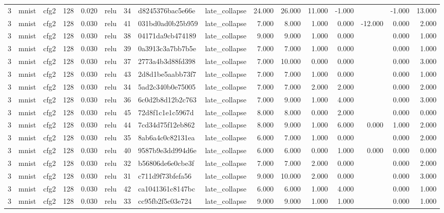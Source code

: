 \begin{table}[htbp]
{\begin{tabular}{@{}rllrrlrllrrrrrrr@{}}
3 & mnist & cfg2 & 128 & 0.020 & relu & 34 & d8245376bac5e66e & late\_collapse & 24.000 & 26.000 & 11.000 & -1.000 &  & -1.000 & 13.000 \\
3 & mnist & cfg2 & 128 & 0.030 & relu & 41 & 031bd0ad0b25b959 & late\_collapse & 7.000 & 8.000 & 1.000 & 0.000 & -12.000 & 0.000 & 2.000 \\
3 & mnist & cfg2 & 128 & 0.030 & relu & 38 & 04171da9cb474189 & late\_collapse & 9.000 & 9.000 & 1.000 & 0.000 &  & 0.000 & 1.000 \\
3 & mnist & cfg2 & 128 & 0.030 & relu & 39 & 0a3913c3a7bb7b5e & late\_collapse & 7.000 & 7.000 & 1.000 & 0.000 &  & 0.000 & 1.000 \\
3 & mnist & cfg2 & 128 & 0.030 & relu & 37 & 2773a4b3d88fd398 & late\_collapse & 7.000 & 10.000 & 0.000 & 0.000 &  & 0.000 & 3.000 \\
3 & mnist & cfg2 & 128 & 0.030 & relu & 43 & 2d8d1be5aabb73f7 & late\_collapse & 7.000 & 7.000 & 1.000 & 0.000 &  & 0.000 & 1.000 \\
3 & mnist & cfg2 & 128 & 0.030 & relu & 34 & 5ad2c340b0e75005 & late\_collapse & 7.000 & 7.000 & 2.000 & 2.000 &  & 0.000 & 2.000 \\
3 & mnist & cfg2 & 128 & 0.030 & relu & 36 & 6c0d2b8d12b2c763 & late\_collapse & 7.000 & 9.000 & 1.000 & 4.000 &  & 0.000 & 3.000 \\
3 & mnist & cfg2 & 128 & 0.030 & relu & 45 & 72d8f1c1e1c5967d & late\_collapse & 8.000 & 8.000 & 0.000 & 2.000 &  & 0.000 & 0.000 \\
3 & mnist & cfg2 & 128 & 0.030 & relu & 44 & 7cd34d75f12eb862 & late\_collapse & 8.000 & 9.000 & 1.000 & 6.000 & 0.000 & 1.000 & 2.000 \\
3 & mnist & cfg2 & 128 & 0.030 & relu & 35 & 8ab6a4c0c82131ea & late\_collapse & 6.000 & 7.000 & 1.000 & 0.000 &  & 0.000 & 2.000 \\
3 & mnist & cfg2 & 128 & 0.030 & relu & 40 & 9587b9e3dd994d6e & late\_collapse & 6.000 & 6.000 & 0.000 & 1.000 & 0.000 & 0.000 & 0.000 \\
3 & mnist & cfg2 & 128 & 0.030 & relu & 32 & b56806de6e0cbe3f & late\_collapse & 7.000 & 7.000 & 2.000 & 0.000 &  & 0.000 & 2.000 \\
3 & mnist & cfg2 & 128 & 0.030 & relu & 31 & c711d9f73bfefa56 & late\_collapse & 9.000 & 10.000 & 2.000 & 0.000 &  & 0.000 & 3.000 \\
3 & mnist & cfg2 & 128 & 0.030 & relu & 42 & ca1041361c8147bc & late\_collapse & 6.000 & 6.000 & 1.000 & 4.000 &  & 0.000 & 1.000 \\
3 & mnist & cfg2 & 128 & 0.030 & relu & 33 & cc95fb2f5c03e724 & late\_collapse & 9.000 & 9.000 & 1.000 & 1.000 &  & 0.000 & 1.000 \\
\bottomrule
\end{tabular}}
\end{table}

